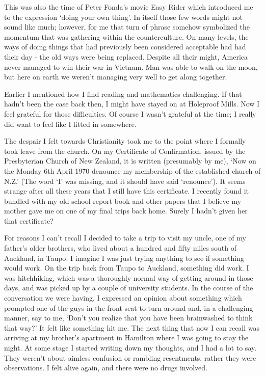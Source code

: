 This was also the time of Peter Fonda's movie Easy Rider which
introduced me to the expression `doing your own thing'. In itself those
few words might not sound like much; however, for me that turn of phrase
somehow symbolized the momentum that was gathering within the
counterculture. On many levels, the ways of doing things that had
previously been considered acceptable had had their day - the old ways were being replaced. Despite all their
might, America never managed to win their war in Vietnam. Man was able
to walk on the moon, but here on earth we weren't managing very well to
get along together.

Earlier I mentioned how I find reading and mathematics challenging. If
that hadn't been the case back then, I might have stayed on at Holeproof
Mills. Now I feel grateful for those difficulties. Of course I wasn't
grateful at the time; I really did want to feel like I fitted in
somewhere.

The despair I felt towards Christianity took me to the point where I
formally took leave from the church. On my Certificate of Confirmation,
issued by the Presbyterian Church of New Zealand, it is written
(presumably by me), `Now on the Monday 6th April 1970 denounce my
membership of the established church of N.Z.' (The word `I' was missing,
and it should have said `renounce'). It seems strange after all these
years that I still have this certificate. I recently found it bundled
with my old school report book and other papers that I believe my mother
gave me on one of my final trips back home. Surely I hadn't given her
that certificate?

For reasons I can't recall I decided to take a trip to visit my uncle,
one of my father's older brothers, who lived about a hundred and fifty
miles south of Auckland, in Taupo\cite{taupo}.
I imagine I was just trying anything to see if something would work. On
the trip back from Taupo to Auckland, something did work. I was
hitchhiking, which was a thoroughly normal way of getting around in
those days, and was picked up by a couple of university students. In the
course of the conversation we were having, I expressed an opinion about
something which prompted one of the guys in the front seat to turn
around and, in a challenging manner, say to me, `Don't you realize that
you have been brainwashed to think that way?' It felt like something hit
me. The next thing that now I can recall was arriving at my brother's
apartment in Hamilton where I was going to stay the night. At some stage
I started writing down my thoughts, and I had a lot to say. They weren't
about aimless confusion or rambling resentments, rather they were
observations. I felt alive again, and there were no drugs involved.

